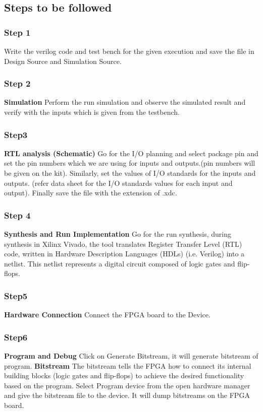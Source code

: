 \documentclass{article}
\begin{document}
\subsection{Steps to be followed}
\subsubsection{Step 1}
Write the verilog code and test bench for the given execution and save  the file in Design Source and Simulation Source.

\subsubsection{Step 2}
\textbf{Simulation}
\newline Perform the run simulation and observe the simulated result and verify with the inputs which is given from the testbench.

\subsubsection{Step3}
\textbf{RTL analysis (Schematic)}
\newline Go for the I/O planning and select package pin and set the pin numbers which we are using for inputs and outputs.(pin numbers will be given on the kit). Similarly, set the values of I/O standards for the inputs and outputs. (refer data sheet for the I/O standards values for each input and output).
Finally save the file with the extension of .xdc.

\subsubsection{Step 4}
\textbf{Synthesis and Run Implementation}
\newline
Go for the run synthesis, during synthesis in Xilinx Vivado, the tool translates Register Transfer Level (RTL) code, written in Hardware Description Languages (HDLs) (i.e. Verilog) into a netlist. This netlist represents a digital circuit composed of logic gates and flip-flops.

\subsubsection{Step5}
\textbf{Hardware Connection}
\newline
Connect the FPGA board to the Device.

\subsubsection{Step6}
\newline
\textbf{Program and Debug }
\newline Click on Generate Bitstream, it will generate bitstream of program.
\newline 
\textbf{Bitstream} The bitstream tells the FPGA how to connect its internal building blocks (logic gates and flip-flops) to achieve the desired functionality based on the program.
\newline Select Program device from the open hardware manager and give the bitstream file to the device. It will dump bitstreams on the FPGA board.
\end{document}
